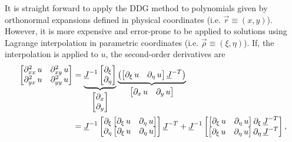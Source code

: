 \documentclass[10pt]{article}
\begin{document}
%
It is straight forward to apply the DDG method to polynomials given by orthonormal expansions defined in physical coordinates (i.e. $\vec{r}\equiv(x,y)$).
%
However, it is more expensive and error-prone to be applied to solutions using Lagrange interpolation in parametric coordinates (i.e. $\vec{\rho}\equiv(\xi,\eta)$).
%
If, the interpolation is applied to $u$, the second-order derivatives are
$$
\begin{aligned}\begin{bmatrix}\partial_{xx}^{2}\,u & \partial_{xy}^{2}\,u\\
\partial_{yx}^{2}\,u & \partial_{yy}^{2}\,u
\end{bmatrix} & =\underbrace{\underline{J}^{-1}\begin{bmatrix}\partial_{\xi}\\
\partial_{\eta}
\end{bmatrix}}_{\begin{bmatrix}\partial_{x}\\
\partial_{y}
\end{bmatrix}}\underbrace{\left(\mathinner{\begin{bmatrix}\partial_{\xi}\,u & \partial_{\eta}\,u\end{bmatrix}}\underline{J}^{-T}\right)}_{\begin{bmatrix}\partial_{x}\,u & \partial_{y}\,u\end{bmatrix}}\\
 & =\underline{J}^{-1}\mathinner{\begin{bmatrix}\partial_{\xi}\mathinner{\begin{bmatrix}\partial_{\xi}\,u & \partial_{\eta}\,u\end{bmatrix}}\\
\partial_{\eta}\mathinner{\begin{bmatrix}\partial_{\xi}\,u & \partial_{\eta}\,u\end{bmatrix}}
\end{bmatrix}}\underline{J}^{-T}+\underline{J}^{-1}\begin{bmatrix}\mathinner{\begin{bmatrix}\partial_{\xi}\,u & \partial_{\eta}\,u\end{bmatrix}}\partial_{\xi}\,\underline{J}^{-T}\\
\mathinner{\begin{bmatrix}\partial_{\xi}\,u & \partial_{\eta}\,u\end{bmatrix}}\partial_{\eta}\,\underline{J}^{-T}
\end{bmatrix},
\end{aligned}
$$
\end{document}
